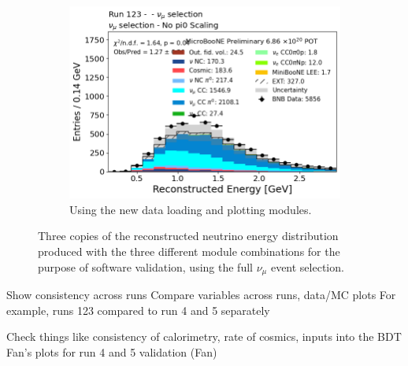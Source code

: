 \begin{figure}[H]
    \hspace{0.3cm}%
    \begin{subfigure}[t]{0.31\linewidth}
        \includegraphics[width=\linewidth]{technote/EventSelections/Figures/Run123_NuMu_RecoEnergy_Old.png}
        \caption{Using the new data loading and plotting modules.}
    \end{subfigure}%
    \caption{Three copies of the reconstructed neutrino energy distribution produced with the three different module combinations for the purpose of software validation, using the full $\nu_{\mu}$ event selection.}
    \label{fig:distvalidation_NuMu}
\end{figure}

Show consistency across runs
Compare variables across runs, data/MC plots 
For example, runs 123 compared to run 4 and 5 separately

Check things like consistency of calorimetry, rate of cosmics, inputs into the BDT
Fan's plots for run 4 and 5 validation (Fan)